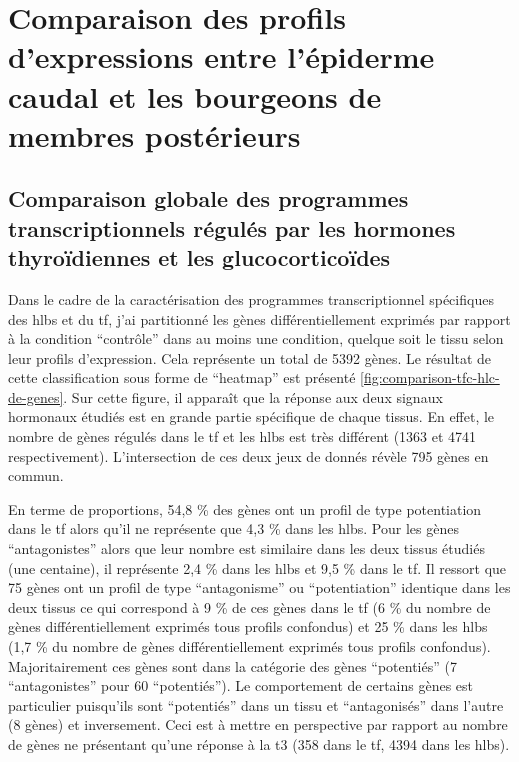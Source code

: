 \documentclass[../main.tex]{subfiles}
\begin{document}
\chapter{Comparaison des profils d'expressions entre l'épiderme caudal et les bourgeons de membres postérieurs}

\section{Comparaison globale des programmes transcriptionnels régulés par les hormones thyroïdiennes et les glucocorticoïdes}

	Dans le cadre de la caractérisation des programmes transcriptionnel spécifiques des \glspl{hlb} et du \gls{tf}, j'ai partitionné les gènes différentiellement exprimés par rapport à la condition ``contrôle'' dans au moins une condition, quelque soit le tissu selon leur profils d'expression.
	Cela représente un total de 5392 gènes.
	Le résultat de cette classification sous forme de ``heatmap'' est présenté \autoref{fig:comparison-tfc-hlc-de-genes}.
	Sur cette figure, il apparaît que la réponse aux deux signaux hormonaux étudiés est en grande partie spécifique de chaque tissus.
	En effet, le nombre de gènes régulés dans le \gls{tf} et les \glspl{hlb} est très différent (1363 et 4741 respectivement).
	L'intersection de ces deux jeux de donnés révèle 795 gènes en commun.
	\par
	En terme de proportions, 54,8 \% des gènes ont un profil de type potentiation dans le \gls{tf} alors qu'il ne représente que 4,3 \% dans les \glspl{hlb}.
	Pour les gènes ``antagonistes'' alors que leur nombre est similaire dans les deux tissus étudiés (une centaine), il représente 2,4 \% dans les \glspl{hlb} et 9,5 \% dans le \gls{tf}.
	Il ressort que 75 gènes ont un profil de type ``antagonisme'' ou ``potentiation'' identique dans les deux tissus ce qui correspond à 9 \% de ces gènes dans le \gls{tf} (6 \% du nombre de gènes différentiellement exprimés tous profils confondus) et 25 \% dans les \glspl{hlb} (1,7 \% du nombre de gènes différentiellement exprimés tous profils confondus).
	Majoritairement ces gènes sont dans la catégorie des gènes ``potentiés'' (7 ``antagonistes'' pour 60 ``potentiés'').
	Le comportement de certains gènes est particulier puisqu'ils sont ``potentiés'' dans un tissu et ``antagonisés'' dans l'autre (8 gènes) et inversement.
	Ceci est à mettre en perspective par rapport au nombre de gènes ne présentant qu'une réponse à la \gls{t3} (358 dans le \gls{tf}, 4394 dans les \glspl{hlb}).
	\par
\end{document}
